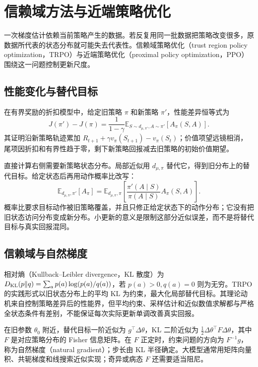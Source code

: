 \setcounter{chapter}{15} %
\chapter{信赖域方法与近端策略优化}
\label{ch:rl-ppo}

一次梯度估计依赖当前策略产生的数据。若反复用同一批数据把策略改变很多，原数据所代表的状态分布就可能失去代表性。信赖域策略优化（trust region policy optimization，TRPO）与近端策略优化（proximal policy optimization，PPO）围绕这一问题控制更新尺度\cite{schulman-trpo,schulman-ppo}。

\section{性能变化与替代目标}

在有界奖励的折扣模型中，给定旧策略 $\pi$ 和新策略 $\pi'$，性能差异恒等式为
\begin{equation}
J(\pi')-J(\pi)=\frac1{1-\gamma}
\mathbb E_{S\sim d_{\mu,\pi'},A\sim\pi'}[A_\pi(S,A)].
\label{eq:rl-performance-difference}
\end{equation}
其证明沿新策略轨迹累加 $R_{t+1}+\gamma v_\pi(S_{t+1})-v_\pi(S_t)$；价值项望远镜相消，尾项因折扣和有界性趋于零，剩下新策略回报减去旧策略的初始价值期望。

直接计算右侧需要新策略状态分布。局部近似用 $d_{\mu,\pi}$ 替代它，得到旧分布上的替代目标。给定状态后再用动作概率比改写：
\[
\mathbb E_{d_{\mu,\pi},\pi'}[A_\pi]
=\mathbb E_{d_{\mu,\pi},\pi}\left[\frac{\pi'(A\mid S)}{\pi(A\mid S)}A_\pi(S,A)\right].
\]
概率比要求目标动作被旧策略覆盖，并且只修正给定状态下的动作分布；它没有把旧状态访问分布变成新分布。小更新的意义是限制这部分近似误差，而不是将替代目标与真实回报混同。

\section{信赖域与自然梯度}

相对熵（Kullback--Leibler divergence，KL 散度）为 $D_{\rm KL}(p\|q)=\sum_a p(a)\log(p(a)/q(a))$，若 $p(a)>0,q(a)=0$ 则为无穷。TRPO 的实践形式以旧状态分布上的平均 KL 为约束，最大化局部替代目标。其理论动机来自控制策略差异后的性能界，但平均约束、采样估计和近似数值求解都与严格全状态条件有差别，不能保证每次实际更新单调改善真实回报。

在旧参数 $\theta_0$ 附近，替代目标一阶近似为 $g^\top\Delta\theta$，KL 二阶近似为 $\tfrac12\Delta\theta^\top F\Delta\theta$，其中 $F$ 是对应策略分布的 Fisher 信息矩阵。在 $F$ 正定时，约束问题的方向为 $F^{-1}g$，称为自然梯度（natural gradient）；步长由 KL 半径确定。大模型通常用矩阵向量积、共轭梯度和线搜索近似实现；奇异或病态 $F$ 还需要适当阻尼。

